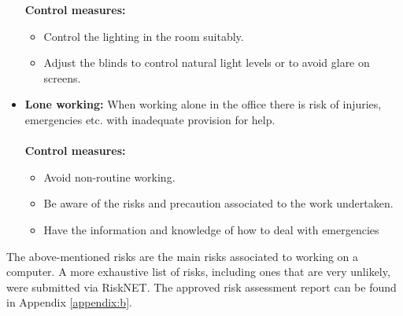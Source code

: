 \documentclass[a4paper,12pt]{report}
\begin{document}
\begin{itemize}
	\textbf{Control measures:}
	\begin{itemize}
		\item Control the lighting in the room suitably.
		\item Adjust the blinds to control natural light levels or to avoid glare on screens.
	\end{itemize}
	\item \textbf{Lone working:} When working alone in the office there is risk of injuries, emergencies etc. with inadequate provision for help.\\ \\
	\textbf{Control measures:}
	\begin{itemize}
		\item Avoid non-routine working.
		\item Be aware of the risks and precaution associated to the work undertaken.
		\item Have the information and knowledge of how to deal with emergencies
	\end{itemize}
\end{itemize}

The above-mentioned risks are the main risks associated to working on a computer. A more exhaustive list of risks, including ones that are very unlikely, were submitted via RiskNET. The approved risk assessment report can be found in Appendix \ref{appendix:b}.	
\end{document}
